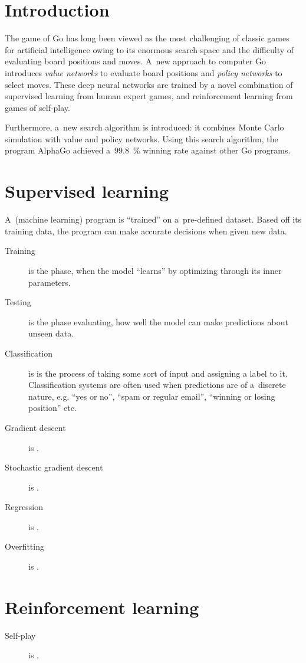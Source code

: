 \documentclass[a4paper,10pt]{article}
\begin{document}

\section{Introduction}
The game of Go has long been viewed as the most challenging of classic games for artificial intelligence owing to its enormous search space and the difficulty of evaluating board positions and moves.
A~new approach to computer Go introduces \emph{value networks} to evaluate board positions and \emph{policy networks} to select moves.
These deep neural networks are trained by a novel combination of supervised learning from human expert games, and reinforcement learning from games of self-play.

Furthermore, a~new search algorithm is introduced: it combines Monte Carlo simulation with value and policy networks.
Using this search algorithm, the program AlphaGo achieved a~99.8~\% winning rate against other Go programs.

\section{Supervised learning}
A~(machine learning) program is ``trained'' on a~pre-defined dataset.
Based off its training data, the program can make accurate decisions when given new data.
\begin{description}
  \item [Training] is the phase, when the model ``learns'' by optimizing through its inner parameters.
  \item [Testing] is the phase evaluating, how well the model can make predictions about unseen data.
  \item [Classification] is is the process of taking some sort of input and assigning a label to it.
    Classification systems are often used when predictions are of a~discrete nature, e.g. ``yes or no'', ``spam or regular email'', ``winning or losing position'' etc.
  \item [Gradient descent] is \todo.
  \item [Stochastic gradient descent] is \todo.
  \item [Regression] is \todo.
  \item [Overfitting] is \todo.
\end{description}

\section{Reinforcement learning}
\begin{description}
  \item [Self-play] is \todo.
\end{description}
\end{document}
